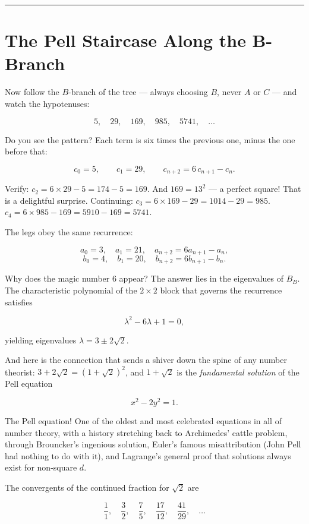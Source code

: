 \bigskip\noindent\rule{\linewidth}{0.4pt}\bigskip

\section{The Pell Staircase Along the B-Branch}
Now follow the \(B\)-branch of the tree --- always choosing \(B\), never \(A\) or \(C\) --- and watch the hypotenuses:

\[5, \quad 29, \quad 169, \quad 985, \quad 5741, \quad \ldots\]

Do you see the pattern? Each term is six times the previous one, minus the one before that:

\[c_0 = 5, \qquad c_1 = 29, \qquad c_{n+2} = 6\,c_{n+1} - c_n.\]

Verify: \(c_2 = 6 \times 29 - 5 = 174 - 5 = 169\). And \(169 = 13^2\) --- a perfect square! That is a delightful surprise. Continuing: \(c_3 = 6 \times 169 - 29 = 1014 - 29 = 985\). \(c_4 = 6 \times 985 - 169 = 5910 - 169 = 5741\).

The legs obey the same recurrence:

\[a_0 = 3,\quad a_1 = 21,\quad a_{n+2} = 6a_{n+1} - a_n,\] \[b_0 = 4,\quad b_1 = 20,\quad b_{n+2} = 6b_{n+1} - b_n.\]

Why does the magic number \(6\) appear? The answer lies in the eigenvalues of \(B_B\). The characteristic polynomial of the \(2 \times 2\) block that governs the recurrence satisfies

\[\lambda^2 - 6\lambda + 1 = 0,\]

yielding eigenvalues \(\lambda = 3 \pm 2\sqrt{2}\).

And here is the connection that sends a shiver down the spine of any number theorist: \(3 + 2\sqrt{2} = (1 + \sqrt{2})^2\), and \(1 + \sqrt{2}\) is the \emph{fundamental solution} of the Pell equation

\[x^2 - 2y^2 = 1.\]

The Pell equation! One of the oldest and most celebrated equations in all of number theory, with a history stretching back to Archimedes' cattle problem, through Brouncker's ingenious solution, Euler's famous misattribution (John Pell had nothing to do with it), and Lagrange's general proof that solutions always exist for non-square \(d\).

The convergents of the continued fraction for \(\sqrt{2}\) are

\[\frac{1}{1}, \quad \frac{3}{2}, \quad \frac{7}{5}, \quad \frac{17}{12}, \quad \frac{41}{29}, \quad \ldots\]

